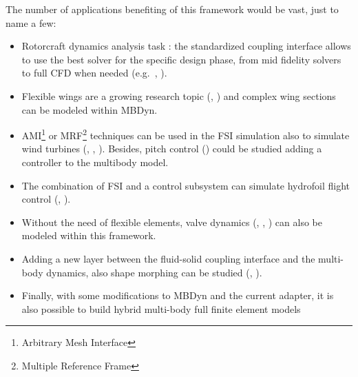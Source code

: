 The number of applications benefiting of this framework would be vast, just to name a few:

\begin{itemize}
    \item Rotorcraft dynamics analysis task \cite{quaranta2004toward}: the standardized coupling interface allows to use the best solver for the specific design phase, from mid fidelity solvers \cite{cocco2020simulation} to full CFD when needed (e.g.\ \cite{cavagna2009simulation}, \cite{masarati2011coupled}).
    \item Flexible wings are a growing research topic (\cite{pusch2019aeroelastic}, \cite{waitman2020h}) and complex wing sections can be modeled within MBDyn.
    \item AMI\footnote{Arbitrary Mesh Interface} or MRF\footnote{Multiple Reference Frame} techniques can be used in the FSI simulation also to simulate wind turbines (\cite{guerri2008fluid}, \cite{rasheed2014comprehensive}, \cite{roul2020fluid}). Besides, pitch control (\cite{baburajan2017pitch}) could be studied adding a controller to the multibody model.
    \item The combination of FSI and a control subsystem can simulate hydrofoil flight control (\cite{lupu2018absolute}, \cite{bousquet2017control}).
    \item Without the need of flexible elements, valve dynamics (\cite{amirante2006flow}, \cite{lisowski2013three}, \cite{frosina2017modeling}) can also be modeled within this framework.
    \item Adding a new layer between the fluid-solid coupling interface and the multi-body dynamics, also shape morphing can be studied (\cite{chanzy2018analysis}, \cite{li2018review}).
    \item Finally, with some modifications to MBDyn and the current adapter, it is also possible to build hybrid multi-body full finite element models \cite{cumnuantip2018assessment}
\end{itemize}
